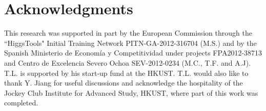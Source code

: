 \documentclass[preprintnumbers,superscriptaddress,nofootinbib,aps,prd,floatfix]{revtex4}
\begin{document}
\section{Acknowledgments}
This research was supported in part by the European Commission through the ``HiggsTools" Initial Training Network PITN-GA-2012-316704 (M.S.) and 
by the Spanish Ministerio de Econom\'ia y Competitividad  under projects FPA2012-38713 and Centro de Excelencia Severo Ochoa SEV-2012-0234 (M.C., T.F. and A.J). T.L. is supported by his start-up fund at the HKUST. T.L.  would also like to thank Y. Jiang for useful discussions and acknowledge the hospitality of the Jockey Club Institute for Advanced Study, HKUST, where part of this work was completed. 


\appendix
\label{app:amplitudes}


%
%
\end{document}
